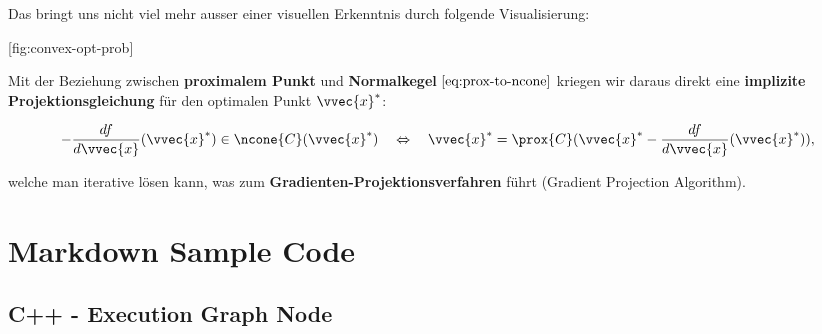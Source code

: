 \documentclass[
  12pt,
  american,
  a4paper,
  twoside,
  titlepage,
  openright,
  numbers=noenddot,
  chapterprefix=true,
  headings=optiontohead,
  svgnames,
  dvipsnames]{scrreprt}
\begin{document}
Das bringt uns nicht viel mehr ausser einer visuellen Erkenntnis durch
folgende Visualisierung:

[fig:convex-opt-prob]

Mit der Beziehung zwischen \textbf{proximalem Punkt} und
\textbf{Normalkegel} \(\eqref{eq:prox-to-ncone}\) kriegen wir daraus
direkt eine \textbf{implizite Projektionsgleichung} für den optimalen
Punkt \(\vvec{x}^*\):

\begin{align}
-\frac{df}{d\vvec{x}}(\vvec{x}^*) \in \ncone{C}(\vvec{x}^*) \quad \Leftrightarrow \quad \vvec{x}^* = \prox{C}(\vvec{x}^* - \frac{df}{d\vvec{x}}(\vvec{x}^*)),
\end{align}

welche man iterative lösen kann, was zum
\textbf{Gradienten-Projektionsverfahren} führt (Gradient Projection
Algorithm).

\hypertarget{markdown-sample-code}{%
\chapter{Markdown Sample Code}\label{markdown-sample-code}}

\hypertarget{c---execution-graph-node}{%
\section{C++ - Execution Graph Node}\label{c---execution-graph-node}}
\end{document}
